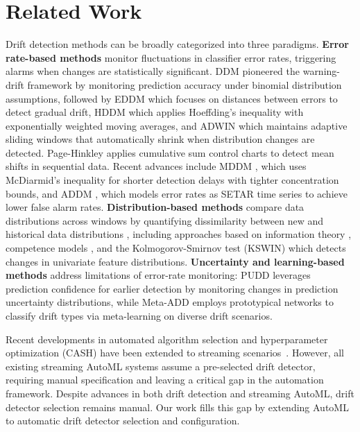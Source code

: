 \documentclass{article}
\begin{document}
\section{Related Work}
\label{sec:related}

Drift detection methods can be broadly categorized into three paradigms. \textbf{Error rate-based methods} monitor fluctuations in classifier error rates, triggering alarms when changes are statistically significant. DDM \cite{Gama2004DDM} pioneered the warning-drift framework by monitoring prediction accuracy under binomial distribution assumptions, followed by EDDM \cite{BaenaGarcia2006EDDM} which focuses on distances between errors to detect gradual drift, HDDM \cite{FriasBlanco2015Hoeffding} which applies Hoeffding's inequality with exponentially weighted moving averages, and ADWIN \cite{Bifet2007ADWIN} which maintains adaptive sliding windows that automatically shrink when distribution changes are detected. Page-Hinkley \cite{Page1954Continuous} applies cumulative sum control charts to detect mean shifts in sequential data. Recent advances include MDDM \cite{Pesaranghader2017MDDM}, which uses McDiarmid's inequality for shorter detection delays with tighter concentration bounds, and ADDM \cite{Mayaki2022ADDM}, which models error rates as SETAR time series \cite{Tsay1989TestingAM} to achieve lower false alarm rates. \textbf{Distribution-based methods} compare data distributions across windows by quantifying dissimilarity between new and historical data distributions \cite{Kifer2004ChangeDetection}, including approaches based on information theory \cite{Dasu2006InformationTheoretic}, competence models \cite{Lu2014CompetenceModels}, and the Kolmogorov-Smirnov test (KSWIN) \cite{Raab2020KSWIN} which detects changes in univariate feature distributions. \textbf{Uncertainty and learning-based methods} address limitations of error-rate monitoring: PUDD \cite{Lu2025PUDD} leverages prediction confidence for earlier detection by monitoring changes in prediction uncertainty distributions, while Meta-ADD \cite{Yu2021MetaADD} employs prototypical networks to classify drift types via meta-learning on diverse drift scenarios.

Recent developments in automated algorithm selection and hyperparameter optimization (CASH) \cite{Hutter2019AutoML} have been extended to streaming scenarios~\cite{kulbach2022evolution}. 
However, all existing streaming AutoML systems assume a pre-selected drift detector, requiring manual specification and leaving a critical gap in the automation framework. Despite advances in both drift detection and streaming AutoML, drift detector selection remains manual. Our work fills this gap by extending AutoML to automatic drift detector selection and configuration.
\end{document}
